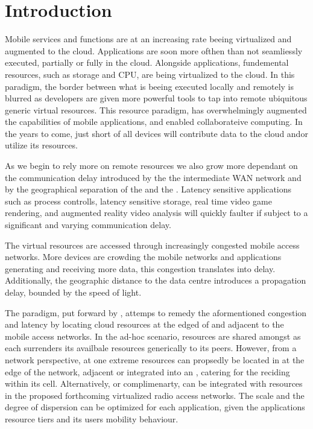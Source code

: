 \section{Introduction}
Mobile services and \ue functions are at an increasing rate beeing virtualized and augmented to the cloud. Applications are soon more ofthen than not seamliessly executed, partially or fully in the cloud. Alongside applications, fundemental \ue resources, such as storage and CPU, are being virtualized to the cloud. In this paradigm, the border between what is beeing executed locally and remotely is blurred as developers are given more powerful tools to tap into remote ubiquitous generic virtual resources. This resource paradigm, has overwhelmingly augmented the capabilities of mobile applications, and enabled collaborateive computing. In the years to come, just short of all devices will contribute data to the cloud and\/or utilize its resources.

As we begin to rely more on remote resources we also grow more dependant on the communication delay introduced by the the intermediate WAN network and by the geographical separation of the \ue and the \dc. Latency sensitive applications such as process controlls, latency sensitive storage, real time video game rendering, and augmented reality video analysis will quickly faulter if subject to a significant and varying communication delay.

The virtual resources are accessed through increasingly congested mobile access networks. More devices are crowding the mobile networks and applications generating and receiving more data, this congestion translates into delay. Additionally, the geographic distance to the data centre introduces a propagation delay, bounded by the speed of light.

The \xcloud paradigm, put forward by \cite{chandra2013decentralized,ericsson_akami}, attemps to remedy the aformentioned congestion and latency by locating cloud resources at the edged of and adjacent to the mobile access networks. In the ad-hoc scenario, resources are shared amongst \ues as each \ue surrenders its availbale resources generically to its peers. However, from a network perspective, at one extreme \dc resources can propsedly be located in at the edge of the network, adjacent or integrated into an \rbs, catering for the \ues reciding within its cell. Alternatively, or complimenarty, \dcs can be integrated with resources in the proposed forthcoming virtualized radio access networks. The scale and the degree of dispersion can be optimized for each application, given the applications resource tiers and its users mobility behaviour.

